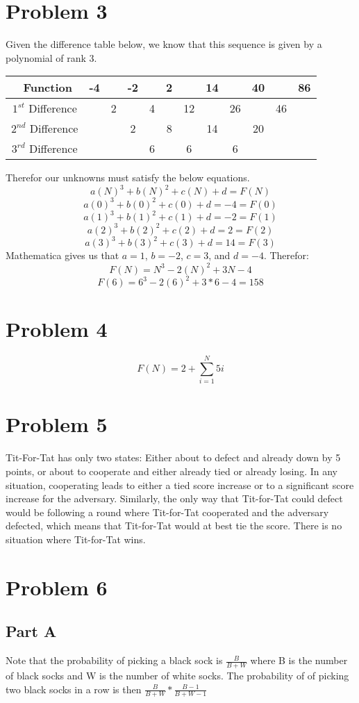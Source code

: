 \documentclass[11pt]{article}
\begin{document}
\section*{Problem 3}
Given the difference table below, we know that this sequence is given by a polynomial of rank 3.
\begin{center}
\begin{tabular}{| c | c | c | c | c | c | c | c | c | c | c | c |}
 \hline\
 Function & -4 && -2 && 2 && 14 && 40 && 86 \\ \hline
 $1^{st}$ Difference && 2 && 4  && 12 && 26 && 46 & \\ \hline
 $2^{nd}$ Difference &&& 2 && 8 && 14 && 20 && \\ \hline
 $3^{rd}$ Difference &&&& 6 && 6 && 6 &&& \\ \hline
\end{tabular}
\end{center}
Therefor our unknowns must satisfy the below equations.
\[a(N)^3 + b(N)^2 + c(N) + d = F(N)\]
\[a(0)^3 + b(0)^2 + c(0) + d = -4 = F(0)\]
\[a(1)^3 + b(1)^2 + c(1) + d = -2 = F(1)\]
\[a(2)^3 + b(2)^2 + c(2) + d = 2 = F(2)\]
\[a(3)^3 + b(3)^2 + c(3) + d = 14 = F(3)\]
Mathematica gives us that $a=1$, $b=-2$, $c=3$, and $d=-4$. Therefor:
\[F(N) = N^3 - 2(N)^2 + 3N -4\]
\[F(6) = 6^3 - 2(6)^2 + 3*6 -4 = 158\]

\section*{Problem 4}
\[F(N) = 2 + \sum\limits_{i=1}^N 5i\]

\section*{Problem 5}
Tit-For-Tat has only two states: Either about to defect and already down by 5 points, or about to cooperate and either already tied or already losing. In any situation, cooperating leads to either a tied score increase or to a significant score increase for the adversary. Similarly, the only way that Tit-for-Tat could defect would be following a round where Tit-for-Tat cooperated and the adversary defected, which means that Tit-for-Tat would at best tie the score. There is no situation where Tit-for-Tat wins.

\section*{Problem 6}
\subsection*{Part A}
Note that the probability of picking a black sock is $\frac{B}{B+W}$ where B is the number of black socks and W is the number of white socks. The probability of of picking two black socks in a row is then $\frac{B}{B+W} * \frac{B-1}{B+W-1}$
\end{document}
